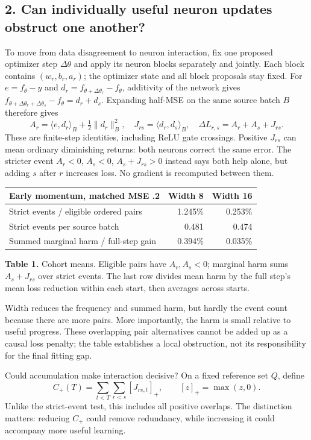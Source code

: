 \documentclass[11pt,a4paper]{article}
\begin{document}
\newpage
\subsection*{2. Can individually useful neuron updates obstruct one another?}
To move from data disagreement to neuron interaction, fix one proposed optimizer
step $\Delta\theta$ and apply its neuron blocks separately and jointly. Each block
contains $(w_r,b_r,a_r)$; the optimizer state and all block proposals stay fixed.
For $e=f_\theta-y$ and $d_r=f_{\theta+\Delta\theta_r}-f_\theta$, additivity of the
network gives $f_{\theta+\Delta\theta_r+\Delta\theta_s}-f_\theta=d_r+d_s$.
Expanding half-MSE on the same source batch $B$ therefore gives
\[
A_r=\langle e,d_r\rangle_B+\tfrac12\|d_r\|_B^2,\quad
J_{rs}=\langle d_r,d_s\rangle_B,\quad
\Delta L_{r,s}=A_r+A_s+J_{rs}.
\]
These are finite-step identities, including ReLU gate crossings. Positive $J_{rs}$
can mean ordinary diminishing returns: both neurons correct the same error.
The stricter event $A_r<0$, $A_s<0$, $A_s+J_{rs}>0$ instead says both help alone,
but adding $s$ after $r$ increases loss. No gradient is recomputed between them.

\begin{center}
\small
\begin{tabular}{lrr}
\toprule
Early momentum, matched MSE .2 & Width 8 & Width 16\\
\midrule
Strict events / eligible ordered pairs & 1.245\% & 0.253\%\\
Strict events per source batch & 0.481 & 0.474\\
Summed marginal harm / full-step gain & 0.394\% & 0.035\%\\
\bottomrule
\end{tabular}
\end{center}
{\fontsize{9}{11}\selectfont\raggedright
\textbf{Table 1.} Cohort means. Eligible pairs have $A_r,A_s<0$; marginal harm sums
$A_s+J_{rs}$ over strict events. The last row divides mean harm by the full step's
mean loss reduction within each start, then averages across starts.\par}

Width reduces the frequency and summed harm, but hardly the event count because
there are more pairs. More importantly, the harm is small relative to useful
progress. These overlapping pair alternatives cannot be added up as a causal
loss penalty; the table establishes a local obstruction, not its responsibility
for the final fitting gap.

Could accumulation make interaction decisive? On a fixed reference set $Q$, define
\[
C_+(T)=\sum_{t<T}\sum_{r<s}[J_{rs,t}]_+,\qquad [z]_+=\max(z,0).
\]
Unlike the strict-event test, this includes all positive overlaps. The distinction
matters: reducing $C_+$ could remove redundancy, while increasing it could accompany
more useful learning.
\end{document}
